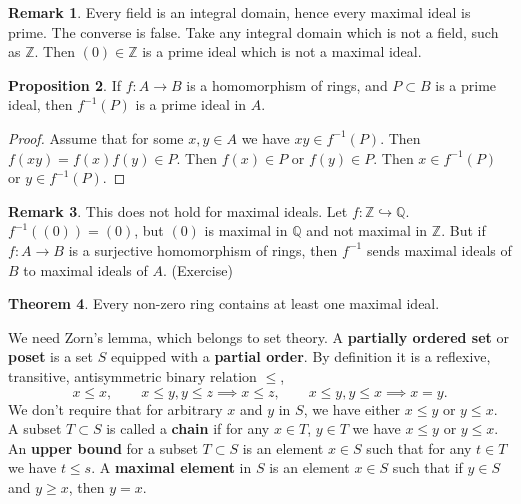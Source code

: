 \documentclass{article}
\newcommand{\Z}{\mathbb{Z}}
\newcommand{\Q}{\mathbb{Q}}
\newcommand{\rb}[1]{\left( #1 \right)}
\theoremstyle{definition}\newtheorem{definition}{Definition}[section]
\theoremstyle{definition}\newtheorem{remark}[definition]{Remark}
\theoremstyle{definition}\newtheorem*{example}{Example}
\theoremstyle{definition}\newtheorem*{note}{Note}
\newtheorem{proposition}[definition]{Proposition}
\newtheorem{theorem}[definition]{Theorem}
\begin{document}
\begin{remark}
Every field is an integral domain, hence every maximal ideal is prime. The converse is false. Take any integral domain which is not a field, such as $ \Z $. Then $ \rb{0} \in \Z $ is a prime ideal which is not a maximal ideal.
\end{remark}

\begin{proposition}
If $ f : A \to B $ is a homomorphism of rings, and $ P \subset B $ is a prime ideal, then $ f^{-1}\rb{P} $ is a prime ideal in $ A $.
\end{proposition}

\begin{proof}
Assume that for some $ x, y \in A $ we have $ xy \in f^{-1}\rb{P} $. Then $ f\rb{xy} = f\rb{x}f\rb{y} \in P $. Then $ f\rb{x} \in P $ or $ f\rb{y} \in P $. Then $ x \in f^{-1}\rb{P} $ or $ y \in f^{-1}\rb{P} $.
\end{proof}

\begin{remark}
This does not hold for maximal ideals. Let $ f : \Z \hookrightarrow \Q $. $ f^{-1}\rb{\rb{0}} = \rb{0} $, but $ \rb{0} $ is maximal in $ \Q $ and not maximal in $ \Z $. But if $ f : A \to B $ is a surjective homomorphism of rings, then $ f^{-1} $ sends maximal ideals of $ B $ to maximal ideals of $ A $. (Exercise)
\end{remark}

\begin{theorem}
\label{thm:4.6}
Every non-zero ring contains at least one maximal ideal.
\end{theorem}

We need Zorn's lemma, which belongs to set theory. A \textbf{partially ordered set} or \textbf{poset} is a set $ S $ equipped with a \textbf{partial order}. By definition it is a reflexive, transitive, antisymmetric binary relation $ \le $,
$$ x \le x, \qquad x \le y, y \le z \implies x \le z, \qquad x \le y, y \le x \implies x = y. $$
We don't require that for arbitrary $ x $ and $ y $ in $ S $, we have either $ x \le y $ or $ y \le x $. A subset $ T \subset S $ is called a \textbf{chain} if for any $ x \in T $, $ y \in T $ we have $ x \le y $ or $ y \le x $. An \textbf{upper bound} for a subset $ T \subset S $ is an element $ x \in S $ such that for any $ t \in T $ we have $ t \le s $. A \textbf{maximal element} in $ S $ is an element $ x \in S $ such that if $ y \in S $ and $ y \ge x $, then $ y = x $.

\end{document}
